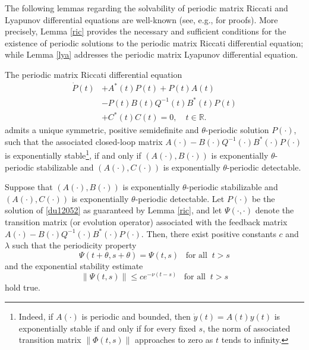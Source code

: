 \documentclass{IEEEtran}
\begin{document}
	The following lemmas regarding the solvability of periodic matrix Riccati and Lyapunov differential equations are well-known (see, e.g., \cite[Theorems 2 and 4]{BCG2} for proofs).
	More precisely, Lemma \ref{ric} provides the necessary and sufficient conditions for the existence of periodic solutions to the periodic matrix Riccati differential equation; while  
	Lemma \ref{lya} addresses the periodic matrix Lyapunov differential equation.
	
	\begin{lemma}\label{ric}
		The periodic matrix Riccati differential equation
		\begin{equation}\label{du12052}
			\begin{split}
				\dot{P}(t)&+A^*(t)P(t)+P(t)A(t)\\
				&-P(t)B(t)Q^{-1}(t)B^*(t)P(t)\\
				&+C^*(t)C(t)=0,\quad t\in\mathbb{R}.
			\end{split}
		\end{equation}
		admits a unique symmetric, positive semidefinite and $\theta$-periodic
		solution $P(\cdot)$, such that the associated closed-loop matrix  $A(\cdot)-B(\cdot)Q^{-1}(\cdot)B^*(\cdot)P(\cdot)$ is exponentially stable\footnote{Indeed, if $A(\cdot)$ is periodic and bounded, then $\dot y(t)=A(t)y(t)$ is exponentially stable if and only if for every fixed $s$, the norm of associated transition matrix $\|\Phi(t,s)\|$ approaches to zero as $t$ tends to infinity.},
		if and only if
		$(A(\cdot),B(\cdot))$ is exponentially $\theta$-periodic stabilizable
		and $(A(\cdot), C(\cdot))$ is exponentially $\theta$-periodic detectable.
	\end{lemma}
	
	\begin{remark}\label{du120505}
		Suppose that $(A(\cdot),B(\cdot))$ is exponentially $\theta$-periodic stabilizable
		and $(A(\cdot), C(\cdot))$ is exponentially $\theta$-periodic detectable.
		Let $P(\cdot)$ be the solution of \eqref{du12052} as guaranteed by Lemma \ref{ric}, and let $\Psi(\cdot,\cdot)$ denote the transition matrix (or evolution operator) associated with the feedback matrix $A(\cdot)-B(\cdot)Q^{-1}(\cdot)B^*(\cdot)P(\cdot)$. 
		Then, there exist positive constants $c$ and $\lambda$ such that the periodicity property
		\begin{equation}\label{du12051}
			\Psi(t+\theta,s+\theta)=\Psi(t,s) \;\;\;\text{for all}\;\;t>s
		\end{equation}
		and the exponential stability estimate
		\begin{equation}
			\|\Psi(t,s)\|\leq ce^{-\nu (t-s)}\;\;\;\text{for all}\;\;t>s
		\end{equation}
		hold true.
	\end{remark}
	
\end{document}
